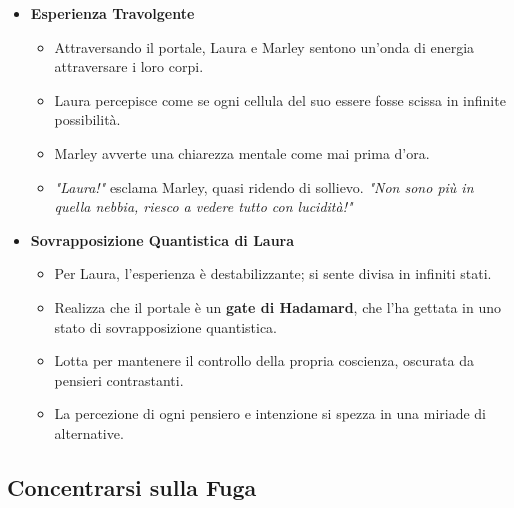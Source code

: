 \begin{itemize}
    \item \textbf{Esperienza Travolgente}
    \begin{itemize}
        \item Attraversando il portale, Laura e Marley sentono un'onda di energia attraversare i loro corpi.
        \item Laura percepisce come se ogni cellula del suo essere fosse scissa in infinite possibilità.
        \item Marley avverte una chiarezza mentale come mai prima d'ora.
        \item \emph{"Laura!"} esclama Marley, quasi ridendo di sollievo. \emph{"Non sono più in quella nebbia, riesco a vedere tutto con lucidità!"}
    \end{itemize}
    
    \item \textbf{Sovrapposizione Quantistica di Laura}
    \begin{itemize}
        \item Per Laura, l'esperienza è destabilizzante; si sente divisa in infiniti stati.
        \item Realizza che il portale è un \textbf{gate di Hadamard}, che l'ha gettata in uno stato di sovrapposizione quantistica.
        \item Lotta per mantenere il controllo della propria coscienza, oscurata da pensieri contrastanti.
        \item La percezione di ogni pensiero e intenzione si spezza in una miriade di alternative.
    \end{itemize}
\end{itemize}

\subsection*{Concentrarsi sulla Fuga}

